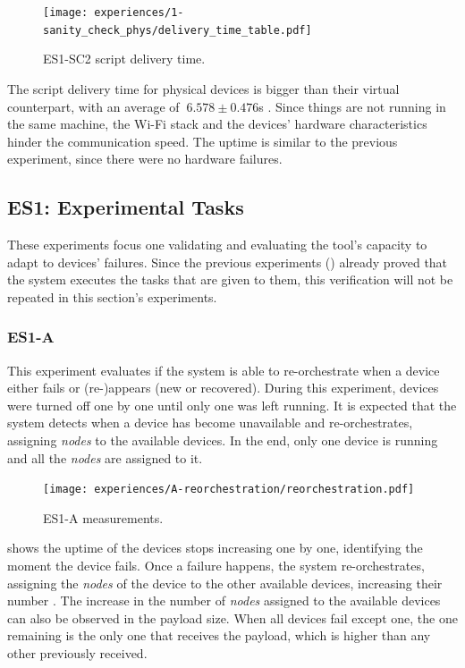 \begin{figure}[h]
\centering
\texttt{[image: experiences/1-sanity\_check\_phys/delivery\_time\_table.pdf]}
\caption[ES1-SC2 script delivery time.]{ES1-SC2 script delivery time.}\label{fig:sanity_check_phys_delivery_time}
\end{figure}

The script delivery time for physical devices is bigger than their virtual counterpart, with an average of $~6.578\pm0.476$s . Since things are not running in the same machine, the Wi-Fi stack and the devices' hardware  characteristics hinder the communication speed. The uptime is similar to the previous experiment, since there were no hardware failures.


\subsection{ES1: Experimental Tasks}\label{sec:discussion_scenario1_exp}

These experiments focus one validating and evaluating the tool's capacity to adapt to devices' failures. Since the previous experiments (\cf {}) already proved that the system executes the tasks that are given to them, this verification will not be repeated in this section's experiments.

\subsubsection{ES1-A}\label{sec:exp_a}

This experiment evaluates if the system is able to re-orchestrate when a device either fails or (re-)appears (\ie new or recovered). During this experiment, devices were turned off one by one until only one was left running. It is expected that the system detects when a device has become unavailable and re-orchestrates, assigning \textit{nodes} to the available devices. In the end, only one device is running and all the \textit{nodes} are assigned to it.

\begin{figure}[h]
\centering
\texttt{[image: experiences/A-reorchestration/reorchestration.pdf]}
\caption[ES1-A measurements]{ES1-A measurements.}\label{fig:experiment_a_graph}
\end{figure}

 shows the uptime of the devices stops increasing one by one, identifying the moment the device fails. Once a failure happens, the system re-orchestrates, assigning the \textit{nodes} of the device to the other available devices, increasing their number . The increase in the number of \textit{nodes} assigned to the available devices can also be observed in the payload size. When all devices fail except one, the one remaining is the only one that receives the payload, which is higher than any other previously received.


